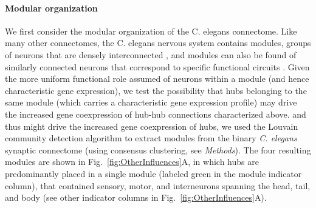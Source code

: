 \documentclass[10pt,letterpaper]{article}
\begin{document}

\paragraph{Modular organization}
We first consider the modular organization of the C. elegans connectome.
Like many other connectomes, the C. elegans nervous system contains modules, groups of neurons that are densely interconnected \cite{Kim2014, Bassett2010}, and modules can also be found of similarly connected neurons that correspond to specific functional circuits \cite{Achacoso:1992ay, Pavlovic2014}.
Given the more uniform functional role assumed of neurons within a module (and hence characteristic gene expression), we test the possibility that hubs belonging to the same module (which carries a characteristic gene expression profile) may drive the increased gene coexpression of hub-hub connections characterized above.
 and thus might drive the increased gene coexpression of hubs, we used the Louvain community detection algorithm to extract modules from the binary \emph{C. elegans} synaptic connectome (using consensus clustering, see \textit{Methods}).
The four resulting modules are shown in Fig.~\ref{fig:OtherInfluences}A, in which hubs are predominantly placed in a single module (labeled green in the module indicator column), that contained sensory, motor, and interneurons spanning the head, tail, and body (see other indicator columns in Fig.~\ref{fig:OtherInfluences}A).
\end{document}
